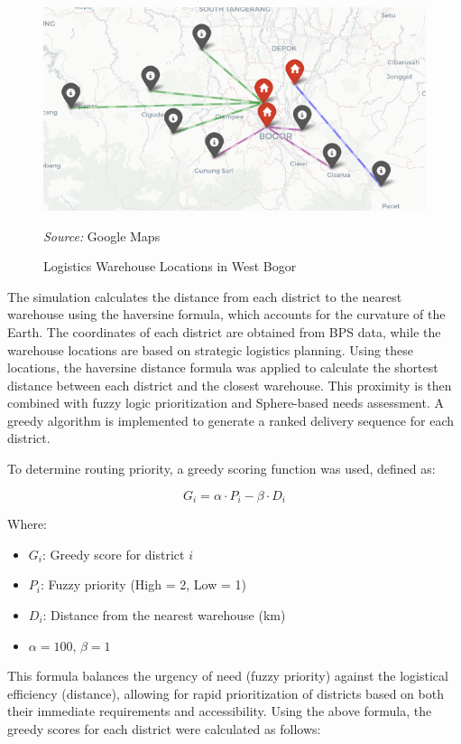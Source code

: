 \documentclass[journal,final,a4paper,twoside,11pt]{IEEEtran}
\begin{document}
\begin{figure}[H]
    \centerline{\includegraphics[width=0.9\linewidth]{fig7.png}}
    \caption{Logistics Warehouse Locations in West Bogor}
    \label{fig:warehouse_location}
    \footnotesize{\textit{Source:} Google Maps}
\end{figure}

The simulation calculates the distance from each district to the nearest warehouse using the haversine formula, which accounts for the curvature of the Earth. The coordinates of each district are obtained from BPS data, while the warehouse locations are based on strategic logistics planning.
Using these locations, the haversine distance formula was applied to calculate the shortest distance between each district and the closest warehouse. This proximity is then combined with fuzzy logic prioritization and Sphere-based needs assessment. A greedy algorithm is implemented to generate a ranked delivery sequence for each district.

To determine routing priority, a greedy scoring function was used, defined as:

\begin{equation}
G_i = \alpha \cdot P_i - \beta \cdot D_i
\end{equation}

Where:
\begin{itemize}
    \item \( G_i \): Greedy score for district \( i \)
    \item \( P_i \): Fuzzy priority (High = 2, Low = 1)
    \item \( D_i \): Distance from the nearest warehouse (km)
    \item \( \alpha = 100 \), \( \beta = 1 \)
\end{itemize}

This formula balances the urgency of need (fuzzy priority) against the logistical efficiency (distance), allowing for rapid prioritization of districts based on both their immediate requirements and accessibility.
Using the above formula, the greedy scores for each district were calculated as follows:
\end{document}
